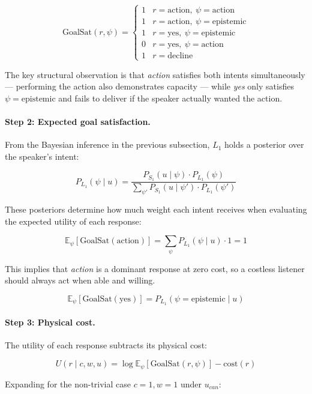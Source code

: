 \documentclass[12pt]{article}
\begin{document}
\[
\text{GoalSat}(r, \psi) = \begin{cases}
1 & r = \text{action},\ \psi = \text{action} \\
1 & r = \text{action},\ \psi = \text{epistemic} \\
1 & r = \text{yes},\   \psi = \text{epistemic} \\
0 & r = \text{yes},\   \psi = \text{action} \\
1 & r = \text{decline}
\end{cases}
\]

The key structural observation is that \textit{action} satisfies both
intents simultaneously --- performing the action also demonstrates
capacity --- while \textit{yes} only satisfies $\psi =
\text{epistemic}$ and fails to deliver if the speaker actually wanted
the action. 

\paragraph{Step 2: Expected goal satisfaction.}

From the Bayesian inference in the previous subsection, $L_1$ holds a
posterior over the speaker's intent:

\[
P_{L_1}(\psi \mid u) = \frac{P_{S_1}(u \mid \psi) \cdot P_{L_1}(\psi)}
{\sum_{\psi'} P_{S_1}(u \mid \psi') \cdot P_{L_1}(\psi')}
\]

These posteriors determine how much weight each intent receives when
evaluating the expected utility of each response:

\[
\mathbb{E}_\psi[\text{GoalSat}(\text{action})]
= \sum_\psi P_{L_1}(\psi \mid u) \cdot 1 = 1
\]

This implies that \textit{action} is a dominant response at zero cost, so a costless listener should always act when able and willing.

\[
\mathbb{E}_\psi[\text{GoalSat}(\text{yes})]
= P_{L_1}(\psi = \text{epistemic} \mid u)
\]

\paragraph{Step 3: Physical cost.}

The utility of each response subtracts its physical cost:

\[
U(r \mid c, w, u)
= \log \mathbb{E}_\psi[\text{GoalSat}(r, \psi)] - \text{cost}(r)
\]

Expanding for the non-trivial case $c=1, w=1$ under $u_{can}$:
\end{document}
